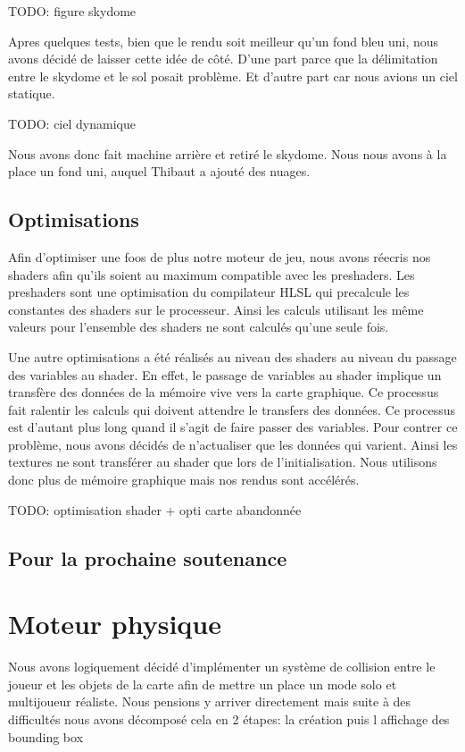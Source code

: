 \documentclass[11pt]{report}
\begin{document}
TODO: figure skydome

Apres quelques tests, bien que le rendu soit meilleur qu’un fond bleu uni, nous avons décidé de laisser cette idée de côté.  D’une part parce que la délimitation entre le skydome et le sol posait problème. Et d’autre part car nous avions un ciel statique.

TODO: ciel dynamique

Nous avons donc fait machine arrière et retiré le skydome. Nous nous avons à la place un fond uni, auquel Thibaut a ajouté des nuages.


\subsection{Optimisations}

Afin d’optimiser une foos de plus notre moteur de jeu, nous avons réecris nos shaders afin qu’ils soient au maximum compatible avec les preshaders. Les preshaders sont une optimisation du compilateur HLSL qui precalcule les constantes des shaders sur le processeur. Ainsi les calculs utilisant les même valeurs pour l’ensemble des shaders ne sont calculés qu’une seule fois.

Une autre optimisations a été réalisés au niveau des shaders au niveau du passage des variables au shader. En effet, le passage de variables au shader implique un transfère des données de la mémoire vive vers la carte graphique. Ce processus fait ralentir les calculs qui doivent attendre le transfers des données. Ce processus est d’autant plus long quand il s’agit de faire passer des variables. Pour contrer ce problème, nous avons décidés de n’actualiser que les données qui varient. Ainsi les textures ne sont transférer au shader que lors de l’initialisation. Nous utilisons donc plus de mémoire graphique mais nos rendus sont accélérés.

TODO: optimisation shader + opti carte abandonnée

\subsection{Pour la prochaine soutenance}

\newpage
\section{Moteur physique}

Nous avons logiquement décidé d’implémenter un système de collision entre le joueur et les objets de la carte afin de mettre un place un mode solo et multijoueur réaliste. 
Nous pensions y arriver directement mais suite à des difficultés nous avons décomposé cela en 2 étapes: la création puis l affichage des bounding box
\end{document}
